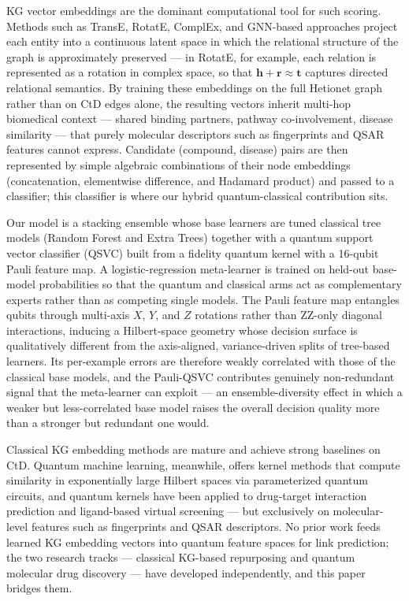 \documentclass[twocolumn,10pt]{article}
\begin{document}
KG vector embeddings are the dominant computational tool for such scoring. Methods such as TransE, RotatE, ComplEx, and GNN-based approaches project each entity into a continuous latent space in which the relational structure of the graph is approximately preserved --- in RotatE, for example, each relation is represented as a rotation in complex space, so that $\mathbf{h}+\mathbf{r}\approx\mathbf{t}$ captures directed relational semantics. By training these embeddings on the full Hetionet graph rather than on CtD edges alone, the resulting vectors inherit multi-hop biomedical context --- shared binding partners, pathway co-involvement, disease similarity --- that purely molecular descriptors such as fingerprints and QSAR features cannot express. Candidate (compound, disease) pairs are then represented by simple algebraic combinations of their node embeddings (concatenation, elementwise difference, and Hadamard product) and passed to a classifier; this classifier is where our hybrid quantum-classical contribution sits.

Our model is a stacking ensemble whose base learners are tuned classical tree models (Random Forest and Extra Trees) together with a quantum support vector classifier (QSVC) built from a fidelity quantum kernel with a 16-qubit Pauli feature map. A logistic-regression meta-learner is trained on held-out base-model probabilities so that the quantum and classical arms act as complementary experts rather than as competing single models. The Pauli feature map entangles qubits through multi-axis $X$, $Y$, and $Z$ rotations rather than ZZ-only diagonal interactions, inducing a Hilbert-space geometry whose decision surface is qualitatively different from the axis-aligned, variance-driven splits of tree-based learners. Its per-example errors are therefore weakly correlated with those of the classical base models, and the Pauli-QSVC contributes genuinely non-redundant signal that the meta-learner can exploit --- an ensemble-diversity effect in which a weaker but less-correlated base model raises the overall decision quality more than a stronger but redundant one would.

Classical KG embedding methods are mature \cite{mayers2023} and achieve strong baselines on CtD. Quantum machine learning, meanwhile, offers kernel methods that compute similarity in exponentially large Hilbert spaces via parameterized quantum circuits, and quantum kernels have been applied to drug-target interaction prediction \cite{qkdti2025} and ligand-based virtual screening \cite{kruger2023} --- but exclusively on molecular-level features such as fingerprints and QSAR descriptors. No prior work feeds learned KG embedding vectors into quantum feature spaces for link prediction; the two research tracks --- classical KG-based repurposing and quantum molecular drug discovery --- have developed independently, and this paper bridges them.
\end{document}
